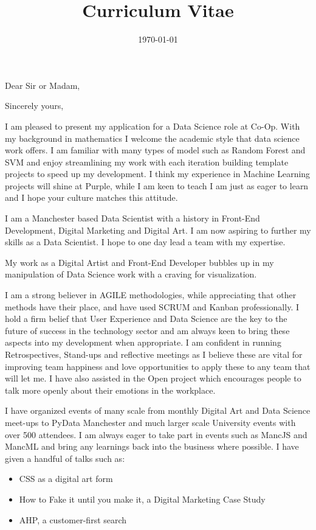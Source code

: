 \documentclass[11pt,a4paper,sans]{moderncv} %
\title{Curriculum Vitae}
\begin{document}


\clearpage

\date{\today} %
\opening{Dear Sir or Madam,} %
\closing{Sincerely yours,} %

\makelettertitle %

I am pleased to present my application for a Data Science role at Co-Op. With my background in mathematics I welcome the academic style that data science work offers. I am familiar with many types of model such as Random Forest and SVM and enjoy streamlining my work with each iteration building template projects to speed up my development. I think my experience in Machine Learning projects will shine at Purple, while I am keen to teach I am just as eager to learn and I hope your culture matches this attitude.

I am a Manchester based Data Scientist with a history in Front-End Development, Digital Marketing and Digital Art. I am now aspiring to further my skills as a Data Scientist. I hope to one day lead a team with my expertise.

My work as a Digital Artist and Front-End Developer bubbles up in my manipulation of Data Science work with a craving for visualization.

I am a strong believer in AGILE methodologies, while appreciating that other methods have their place, and have used SCRUM and Kanban professionally. I hold a firm belief that User Experience and Data Science are the key to the future of success in the technology sector and am always keen to bring these aspects into my development when appropriate. I am confident in running Retrospectives, Stand-ups and reflective meetings as I believe these are vital for improving team happiness and love opportunities to apply these to any team that will let me. I have also assisted in the Open project which encourages people to talk more openly about their emotions in the workplace.

I have organized events of many scale from monthly Digital Art and Data Science meet-ups to PyData Manchester and much larger scale University events with over 500 attendees. I am always eager to take part in events such as MancJS and MancML and bring any learnings back into the business where possible. I have given a handful of talks such as:
\begin{itemize}
\item CSS as a digital art form
\item How to Fake it until you make it, a Digital Marketing Case Study
\item AHP, a customer-first search
\end{itemize}
\end{document}
